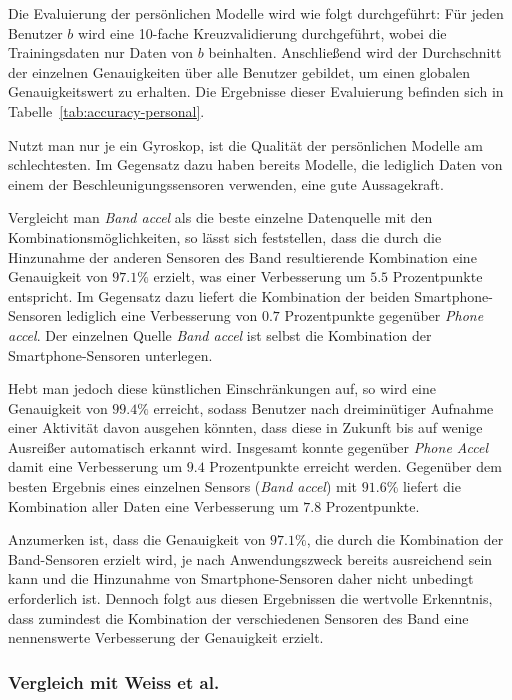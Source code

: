Die Evaluierung der persönlichen Modelle wird wie folgt durchgeführt: Für jeden Benutzer $b$ wird eine 10-fache Kreuzvalidierung durchgeführt, wobei die Trainingsdaten nur Daten von $b$ beinhalten. Anschließend wird der Durchschnitt der einzelnen Genauigkeiten über alle Benutzer gebildet, um einen globalen Genauigkeitswert zu erhalten. Die Ergebnisse dieser Evaluierung befinden sich in Tabelle~\ref{tab:accuracy-personal}.

Nutzt man nur je ein Gyroskop, ist die Qualität der persönlichen Modelle am schlechtesten. Im Gegensatz dazu haben bereits Modelle, die lediglich Daten von einem der Beschleunigungssensoren verwenden, eine gute Aussagekraft.

Vergleicht man \textit{Band accel} als die beste einzelne Datenquelle mit den Kombinationsmöglichkeiten, so lässt sich feststellen, dass die durch die Hinzunahme der anderen Sensoren des Band resultierende Kombination eine Genauigkeit von $97.1 \%$ erzielt, was einer Verbesserung um $5.5$ Prozentpunkte entspricht. Im Gegensatz dazu liefert die Kombination der beiden Smartphone-Sensoren lediglich eine Verbesserung von $0.7$ Prozentpunkte gegenüber \textit{Phone accel}. Der einzelnen Quelle \textit{Band accel} ist selbst die Kombination der Smartphone-Sensoren unterlegen.

Hebt man jedoch diese künstlichen Einschränkungen auf, so wird eine Genauigkeit von $99.4 \%$ erreicht, sodass Benutzer nach dreiminütiger Aufnahme einer Aktivität davon ausgehen könnten, dass diese in Zukunft bis auf wenige Ausreißer automatisch erkannt wird. Insgesamt konnte gegenüber \textit{Phone Accel} damit eine Verbesserung um $9.4$ Prozentpunkte erreicht werden. Gegenüber dem besten Ergebnis eines einzelnen Sensors (\textit{Band accel}) mit $91.6 \%$ liefert die Kombination aller Daten eine Verbesserung um $7.8$ Prozentpunkte.

Anzumerken ist, dass die Genauigkeit von $97.1 \%$, die durch die Kombination der Band-Sensoren erzielt wird, je nach Anwendungszweck bereits ausreichend sein kann und die Hinzunahme von Smartphone-Sensoren daher nicht unbedingt erforderlich ist. Dennoch folgt aus diesen Ergebnissen die wertvolle Erkenntnis, dass zumindest die Kombination der verschiedenen Sensoren des Band eine nennenswerte Verbesserung der Genauigkeit erzielt.

\subsubsection{Vergleich mit Weiss et al.}

